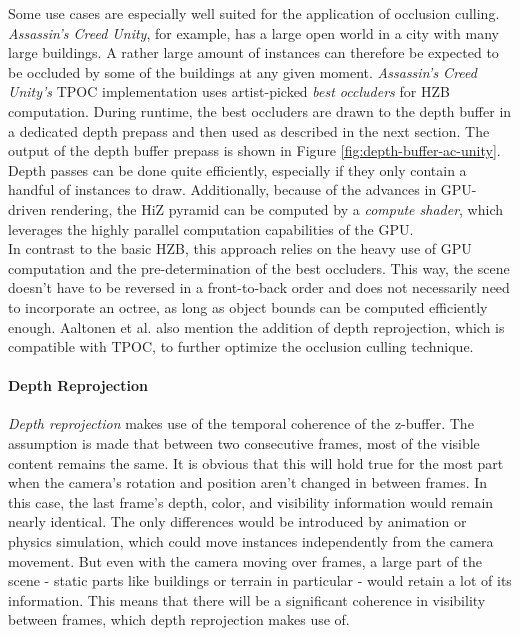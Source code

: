 \noindent
Some use cases are especially well suited for the application of occlusion culling. \emph{Assassin's Creed Unity}, for 
example, has a large open world in a city with many large buildings. A rather large amount of instances can therefore be 
expected to be occluded by some of the buildings at any given moment. \emph{Assassin's Creed Unity's} \ac{TPOC} 
implementation uses artist-picked \emph{best occluders} for \ac{HZB} computation. During runtime, the best occluders are 
drawn to the depth buffer in a dedicated depth prepass and then used as described in the next section. 
The output of the depth buffer prepass is shown in Figure \ref{fig:depth-buffer-ac-unity}. Depth passes can be done 
quite efficiently, especially if they only contain a handful of instances to draw. Additionally, because of the advances 
in \ac{GPU}-driven rendering, the \ac{HiZ} pyramid can be computed by a \emph{compute shader}, which leverages the 
highly parallel computation capabilities of the \ac{GPU}. \\

\noindent
In contrast to the basic \ac{HZB}, this approach relies on the heavy use of \ac{GPU} computation and the 
pre-determination of the best occluders. This way, the scene doesn't have to be reversed in a front-to-back order 
and does not necessarily need to incorporate an octree, as long as object bounds can be computed efficiently enough.
Aaltonen et al. \cite{Aaltonen2015} also mention the addition of depth reprojection, which is compatible with 
\ac{TPOC}, to further optimize the occlusion culling technique.


\paragraph*{Depth Reprojection} \label{subsubsec-depth-reprojection}

\emph{Depth reprojection} makes use of the temporal coherence of the z-buffer. The assumption is made that 
between two consecutive frames, most of the visible content remains the same. It is obvious that this will 
hold true for the most part when the camera's rotation and position aren't changed in between frames. In 
this case, the last frame's depth, color, and visibility information would remain nearly identical. The only 
differences would be introduced by animation or physics simulation, which could move instances independently 
from the camera movement. But even with the camera moving over frames, a large part of the scene - static 
parts like buildings or terrain in particular - would retain a lot of its information. This means that there 
will be a significant coherence in visibility between frames, which depth reprojection makes use of. \\
\enlargethispage{\baselineskip}
\enlargethispage{\baselineskip}


